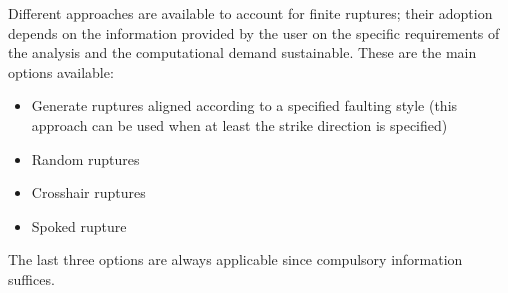Different approaches are available to account for finite ruptures;
their adoption depends on the information provided by the user on
the specific requirements of the analysis and the computational demand
sustainable. 
%
These are the main options available:
\begin{itemize}
	\item Generate ruptures aligned according to a specified faulting style 
	(this approach can be used when at least the strike direction is 
	specified)
	\item Random ruptures 
	\item Crosshair ruptures
	\item Spoked rupture
\end{itemize}
The last three options are always applicable since compulsory information 
suffices.
%

%
